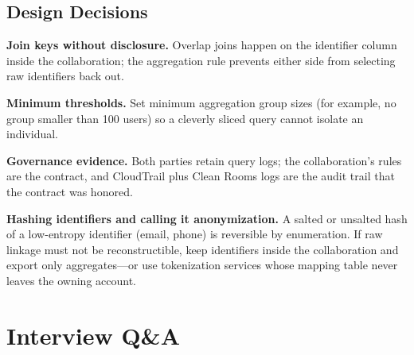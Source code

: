 \subsection{Design Decisions}
\textbf{Join keys without disclosure.} Overlap joins happen on the identifier column inside the collaboration; the aggregation rule prevents either side from selecting raw identifiers back out.

\textbf{Minimum thresholds.} Set minimum aggregation group sizes (for example, no group smaller than 100 users) so a cleverly sliced query cannot isolate an individual.

\textbf{Governance evidence.} Both parties retain query logs; the collaboration's rules are the contract, and CloudTrail plus Clean Rooms logs are the audit trail that the contract was honored.

\begin{pitfall}
\textbf{Hashing identifiers and calling it anonymization.} A salted or unsalted hash of a low-entropy identifier (email, phone) is reversible by enumeration. If raw linkage must not be reconstructible, keep identifiers inside the collaboration and export only aggregates---or use tokenization services whose mapping table never leaves the owning account.
\end{pitfall}

\section{Interview Q\&A}
